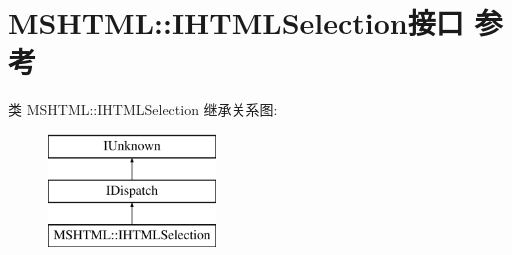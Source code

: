 \hypertarget{interface_m_s_h_t_m_l_1_1_i_h_t_m_l_selection}{}\section{M\+S\+H\+T\+ML\+:\+:I\+H\+T\+M\+L\+Selection接口 参考}
\label{interface_m_s_h_t_m_l_1_1_i_h_t_m_l_selection}
类 M\+S\+H\+T\+ML\+:\+:I\+H\+T\+M\+L\+Selection 继承关系图\+:\begin{figure}[H]
\begin{center}
\leavevmode
\includegraphics[height=3.000000cm]{interface_m_s_h_t_m_l_1_1_i_h_t_m_l_selection}
\end{center}
\end{figure}
